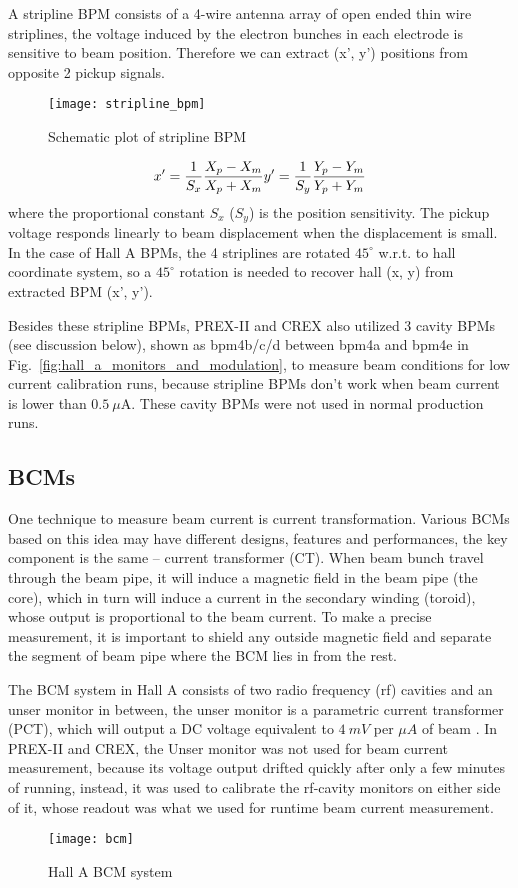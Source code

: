 A stripline BPM consists of a 4-wire antenna array of open ended thin wire striplines, 
the voltage induced by the electron bunches in each electrode is sensitive to beam position.
Therefore we can extract (x', y') positions from opposite 2 pickup signals.
\begin{figure}
    \centering
    \texttt{[image: stripline\_bpm]}
    \caption{Schematic plot of stripline BPM}
\end{figure}
\begin{equation}
    x' = \frac{1}{S_x} \frac{X_p - X_m}{X_p + X_m}   \\
    y' = \frac{1}{S_y} \frac{Y_p - Y_m}{Y_p + Y_m}   
\end{equation}
where the proportional constant $S_x$ ($S_y$) is the position sensitivity. 
The pickup voltage responds linearly to beam displacement when the displacement
is small. In the case of Hall A BPMs, the 4 striplines are rotated $45^\circ$
w.r.t. to hall coordinate system, so a $45^\circ$ rotation is needed to recover
hall (x, y) from extracted BPM (x', y').

Besides these stripline BPMs, PREX-II and CREX also utilized 3 cavity BPMs (see discussion below),
shown as bpm4b/c/d between bpm4a and bpm4e in Fig.~\ref{fig:hall_a_monitors_and_modulation},
to measure beam conditions for low current calibration runs, because stripline
BPMs don't work when beam current is lower than $0.5\ \mu$A. These cavity
BPMs were not used in normal production runs.

\subsection{BCMs}
One technique to measure beam current is current transformation.
Various BCMs based on this idea may have different designs, features and performances, 
the key component is the same -- current transformer (CT). When beam bunch 
travel through the beam pipe, it will induce a magnetic field in the beam pipe (the core), 
which in turn will induce a current in the secondary winding (toroid), 
whose output is proportional to the beam current. 
To make a precise measurement, it is important to shield any outside magnetic 
field and separate the segment of beam pipe where the BCM lies in from the rest.

The BCM system in Hall A consists of two radio frequency (rf) cavities and
an unser monitor in between, the unser monitor is a parametric current transformer (PCT),
which will output a DC voltage equivalent to $4\ mV$ per $\mu A$ of beam \cite{987367}.
In PREX-II and CREX, the Unser monitor was not used for beam current measurement,
because its voltage output drifted quickly after only a few minutes of running,
instead, it was used to calibrate the rf-cavity monitors on either side of it,
whose readout was what we used for runtime beam current measurement.
\begin{figure}
    \centering
    \texttt{[image: bcm]}
    \caption{Hall A BCM system \cite{987367}}
\end{figure}

